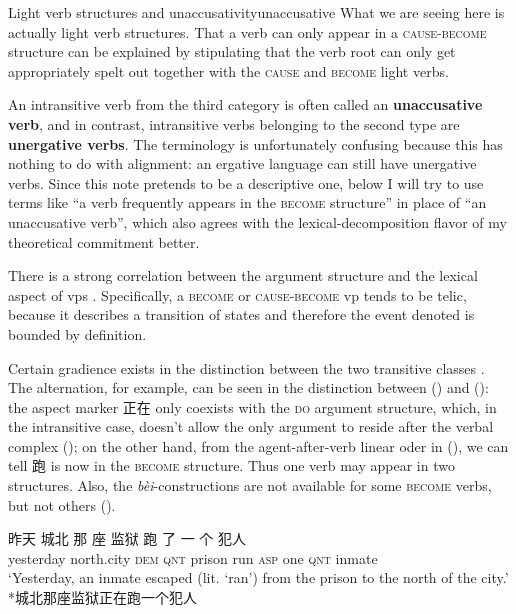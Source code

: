\documentclass[UTF8, a4paper, oneside, scheme=plain]{ctexrep}
\newcommand*{\concept}[1]{\textbf{#1}}
\newcommand{\corpus}[1]{\emph{#1}}
\newcommand{\translate}[1]{`#1'}
\newcommand*{\category}[1]{\textsc{#1}}
\begin{document}
\begin{theorybox}{Light verb structures and unaccusativity}{unaccusative}
    What we are seeing here is actually light verb structures.
    That a verb can only appear in a \category{cause-become} structure 
    can be explained by stipulating that 
    the verb root can only get appropriately spelt out
    together with the \category{cause} and \category{become} light verbs. 

    An intransitive verb from the third category
    is often called an \concept{unaccusative verb}, 
    and in contrast, 
    intransitive verbs belonging to the second type 
    are \concept{unergative verbs}.
    The terminology is unfortunately confusing
    because this has nothing to do with alignment:
    an ergative language can still have unergative verbs.
    Since this note pretends to be a descriptive one, 
    below I will try to use terms like ``a verb frequently appears in the \category{become} structure''
    in place of ``an unaccusative verb'',
    which also agrees with the lexical-decomposition flavor of 
    my theoretical commitment better. 
\end{theorybox}

There is a strong correlation between the argument structure 
and the lexical aspect of \acs{vp}s
\citep{laws2010core,toratani1997typology,aljovic2000unaccusativity}.
Specifically, a \category{become} or \category{cause}-\category{become} \acs{vp}
tends to be telic, 
because it describes a transition of states 
and therefore the event denoted is bounded by definition.

Certain gradience exists in the distinction between the two transitive classes
\citep{lin2021unaccusativity,huang2007}. 
The alternation, for example, can be seen in the distinction
between () 
and ():
the aspect marker 正在 only coexists with the \category{do} argument structure,
which, in the intransitive case, 
doesn't allow the only argument to reside after the verbal complex
();
on the other hand, from the agent-after-verb linear oder in 
(),
we can tell 跑 is now in the \category{become} structure.
Thus one verb may appear in two structures.
Also, the \corpus{bèi}-constructions are not available 
for some \category{become} verbs, but not others 
().

\begin{exe}
    \ex\label{ex:verb-phrase.overview.1} \gll 昨天 城北 那 座 监狱 跑 了 一 个 犯人 \\
    yesterday north.city \category{dem} \category{qnt} prison run \category{asp} one \category{qnt} inmate \\
    \glt \translate{Yesterday, an inmate escaped (lit. `ran') from the prison to the north of the city.} 
    \ex\label{ex:verb-phrase.overview.2} *城北那座监狱正在跑一个犯人
\end{exe}
\end{document}
